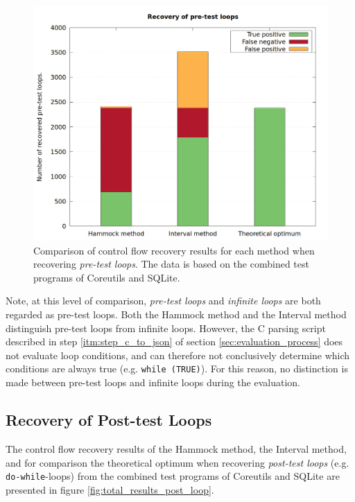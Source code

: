 \begin{figure}[htbp]
	\centering
	\includegraphics[width=\textwidth]{inc/5_results/results_pre_loop.png}
	\caption{Comparison of control flow recovery results for each method when recovering \textit{pre-test loops}. The data is based on the combined test programs of Coreutils and SQLite.}
	\label{fig:total_results_pre_loop}
\end{figure}

Note, at this level of comparison, \textit{pre-test loops} and \textit{infinite loops} are both regarded as pre-test loops. Both the Hammock method and the Interval method distinguish pre-test loops from infinite loops. However, the C parsing script described in step \ref{itm:step_c_to_json} of section \ref{sec:evaluation_process} does not evaluate loop conditions, and can therefore not conclusively determine which conditions are always true (e.g. \texttt{while (TRUE)}). For this reason, no distinction is made between pre-test loops and infinite loops during the evaluation.

\clearpage

\subsection{Recovery of Post-test Loops}

The control flow recovery results of the Hammock method, the Interval method, and for comparison the theoretical optimum when recovering \textit{post-test loops} (e.g. \texttt{do-while}-loops) from the combined test programs of Coreutils and SQLite are presented in figure \ref{fig:total_results_post_loop}.

